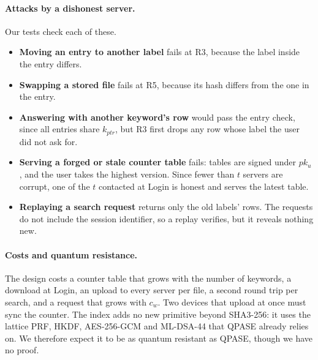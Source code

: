 \paragraph{Attacks by a dishonest server.} Our tests check each of these.
\begin{itemize}
  \item \textbf{Moving an entry to another label} fails at R3, because the label inside the entry differs.
  \item \textbf{Swapping a stored file} fails at R5, because its hash differs from the one in the entry.
  \item \textbf{Answering with another keyword's row} would pass the entry check, since all entries share
        $k_{ptr}$, but R3 first drops any row whose label the user did not ask for.
  \item \textbf{Serving a forged or stale counter table} fails: tables are signed under $pk_u$, and the user takes
        the highest version. Since fewer than $t$ servers are corrupt, one of the $t$ contacted at Login is honest
        and serves the latest table.
  \item \textbf{Replaying a search request} returns only the old labels' rows. The requests do not include the
        session identifier, so a replay verifies, but it reveals nothing new.
\end{itemize}

\paragraph{Costs and quantum resistance.} The design costs a counter table that grows with the number of keywords,
a download at Login, an upload to every server per file, a second round trip per search, and a request that grows
with $c_w$. Two devices that upload at once must sync the counter. The index adds no new primitive beyond SHA3-256:
it uses the lattice PRF, HKDF, AES-256-GCM and ML-DSA-44 that QPASE already relies on. We therefore expect it to be
as quantum resistant as QPASE, though we have no proof.
